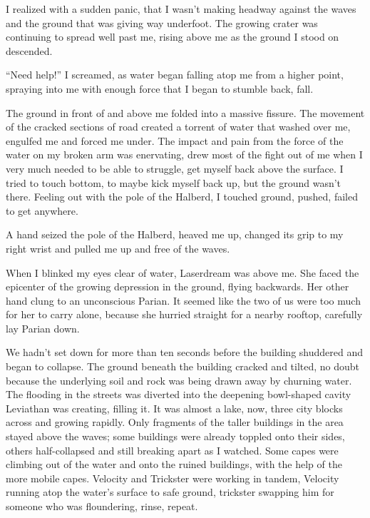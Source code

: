 I realized with a sudden panic, that I wasn't making headway against the waves and the ground that was giving way underfoot.  The growing crater was continuing to spread well past me, rising above me as the ground I stood on descended.



``Need help!'' I screamed, as water began falling atop me from a higher point, spraying into me with enough force that I began to stumble back, fall.



The ground in front of and above me folded into a massive fissure.  The movement of the cracked sections of road created a torrent of water that washed over me, engulfed me and forced me under.  The impact and pain from the force of the water on my broken arm was enervating, drew most of the fight out of me when I very much needed to be able to struggle, get myself  back above the surface.  I tried to touch bottom, to maybe kick myself back up, but the ground wasn't there.  Feeling out with the pole of the Halberd, I touched ground, pushed, failed to get anywhere.



A hand seized the pole of the Halberd, heaved me up, changed its grip to my right wrist and pulled me up and free of the waves.



When I blinked my eyes clear of water, Laserdream was above me.  She faced the epicenter of the growing depression in the ground, flying backwards.  Her other hand clung to an unconscious Parian.  It seemed like the two of us were too much for her to carry alone, because she hurried straight for a nearby rooftop, carefully lay Parian down.



We hadn't set down for more than ten seconds before the building shuddered and began to collapse.  The ground beneath the building cracked and tilted, no doubt because the underlying soil and rock was being drawn away by churning water.  The flooding in the streets was diverted into the deepening bowl-shaped cavity Leviathan was creating, filling it.  It was almost a lake, now, three city blocks across and growing rapidly. Only fragments of the taller buildings in the area stayed above the waves; some buildings were already toppled onto their sides, others half-collapsed and still breaking apart as I watched.  Some capes were climbing out of the water and onto the ruined buildings, with the help of the more mobile capes.  Velocity and Trickster were working in tandem, Velocity running atop the water's surface to safe ground, trickster swapping him for someone who was floundering, rinse, repeat.



